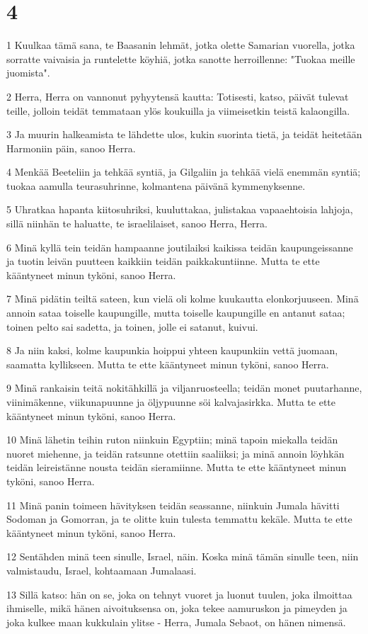 \chapter{4}

\par 1 Kuulkaa tämä sana, te Baasanin lehmät, jotka olette Samarian vuorella, jotka sorratte vaivaisia ja runtelette köyhiä, jotka sanotte herroillenne: "Tuokaa meille juomista".
\par 2 Herra, Herra on vannonut pyhyytensä kautta: Totisesti, katso, päivät tulevat teille, jolloin teidät temmataan ylös koukuilla ja viimeisetkin teistä kalaongilla.
\par 3 Ja muurin halkeamista te lähdette ulos, kukin suorinta tietä, ja teidät heitetään Harmoniin päin, sanoo Herra.
\par 4 Menkää Beeteliin ja tehkää syntiä, ja Gilgaliin ja tehkää vielä enemmän syntiä; tuokaa aamulla teurasuhrinne, kolmantena päivänä kymmenyksenne.
\par 5 Uhratkaa hapanta kiitosuhriksi, kuuluttakaa, julistakaa vapaaehtoisia lahjoja, sillä niinhän te haluatte, te israelilaiset, sanoo Herra, Herra.
\par 6 Minä kyllä tein teidän hampaanne joutilaiksi kaikissa teidän kaupungeissanne ja tuotin leivän puutteen kaikkiin teidän paikkakuntiinne. Mutta te ette kääntyneet minun tyköni, sanoo Herra.
\par 7 Minä pidätin teiltä sateen, kun vielä oli kolme kuukautta elonkorjuuseen. Minä annoin sataa toiselle kaupungille, mutta toiselle kaupungille en antanut sataa; toinen pelto sai sadetta, ja toinen, jolle ei satanut, kuivui.
\par 8 Ja niin kaksi, kolme kaupunkia hoippui yhteen kaupunkiin vettä juomaan, saamatta kyllikseen. Mutta te ette kääntyneet minun tyköni, sanoo Herra.
\par 9 Minä rankaisin teitä nokitähkillä ja viljanruosteella; teidän monet puutarhanne, viinimäkenne, viikunapuunne ja öljypuunne söi kalvajasirkka. Mutta te ette kääntyneet minun tyköni, sanoo Herra.
\par 10 Minä lähetin teihin ruton niinkuin Egyptiin; minä tapoin miekalla teidän nuoret miehenne, ja teidän ratsunne otettiin saaliiksi; ja minä annoin löyhkän teidän leireistänne nousta teidän sieramiinne. Mutta te ette kääntyneet minun tyköni, sanoo Herra.
\par 11 Minä panin toimeen hävityksen teidän seassanne, niinkuin Jumala hävitti Sodoman ja Gomorran, ja te olitte kuin tulesta temmattu kekäle. Mutta te ette kääntyneet minun tyköni, sanoo Herra.
\par 12 Sentähden minä teen sinulle, Israel, näin. Koska minä tämän sinulle teen, niin valmistaudu, Israel, kohtaamaan Jumalaasi.
\par 13 Sillä katso: hän on se, joka on tehnyt vuoret ja luonut tuulen, joka ilmoittaa ihmiselle, mikä hänen aivoituksensa on, joka tekee aamuruskon ja pimeyden ja joka kulkee maan kukkulain ylitse - Herra, Jumala Sebaot, on hänen nimensä.

